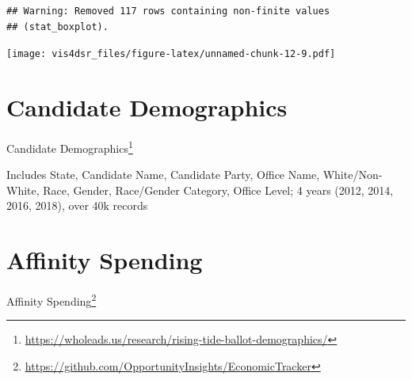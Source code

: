 \documentclass[
]{krantz}
\renewcommand{\href}[2]{#2\footnote{\url{#1}}}
\begin{document}
\begin{verbatim}
## Warning: Removed 117 rows containing non-finite values
## (stat_boxplot).
\end{verbatim}

\texttt{[image: vis4dsr\_files/figure-latex/unnamed-chunk-12-9.pdf]}

\hypertarget{candidate-demographics}{%
\section*{Candidate Demographics}\label{candidate-demographics}}


\href{https://wholeads.us/research/rising-tide-ballot-demographics/}{Candidate Demographics}

Includes State, Candidate Name, Candidate Party, Office Name, White/Non-White, Race, Gender, Race/Gender Category, Office Level; 4 years (2012, 2014, 2016, 2018), over 40k records

\hypertarget{affinity-spending}{%
\section*{Affinity Spending}\label{affinity-spending}}


\href{https://github.com/OpportunityInsights/EconomicTracker}{Affinity Spending}

  

\backmatter
\printindex
\end{document}
